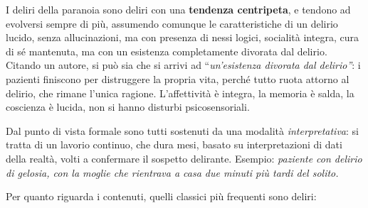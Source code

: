I deliri della paranoia sono deliri con una \textbf{tendenza
centripeta}, e tendono ad evolversi sempre di più, assumendo comunque le
caratteristiche di un delirio lucido, senza allucinazioni, ma con
presenza di nessi logici, socialità integra, cura di sé mantenuta, ma
con un esistenza completamente divorata dal delirio. Citando un autore,
si può sia che si arrivi ad ``\emph{un'esistenza divorata dal
delirio''}: i pazienti finiscono per distruggere la propria vita, perché
tutto ruota attorno al delirio, che rimane l'unica ragione.
L'affettività è integra, la memoria è salda, la coscienza è lucida, non
si hanno disturbi psicosensoriali.

Dal punto di vista formale sono tutti sostenuti da una modalità
\emph{interpretativa}: si tratta di un lavorio continuo, che dura mesi,
basato su interpretazioni di dati della realtà, volti a confermare il
sospetto delirante. Esempio: \emph{paziente con delirio di gelosia, con
la moglie che rientrava a casa due minuti più tardi del solito.}

Per quanto riguarda i contenuti, quelli classici più frequenti sono
deliri:

